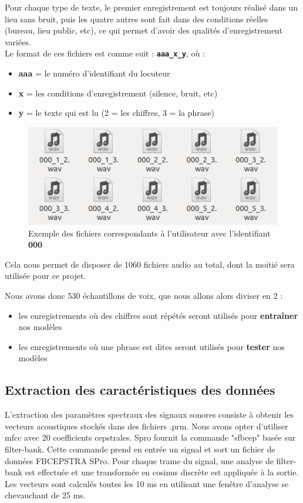 \documentclass[a4paper, 12pt]{book}
\begin{document}
Pour chaque type de texte, le premier enregistrement est toujours réalisé dans un lieu sans bruit, puis les quatre autres sont fait dans des conditions réelles (bureau, lieu public, etc), ce qui permet d'avoir des qualités d'enregistrement variées.\\

Le format de ces fichiers est comme suit : \textbf{\texttt{aaa\_x\_y}}, où :
\begin{itemize}
  \item \textbf{aaa} = le numéro d'identifiant du locuteur
  \item \textbf{x} = les conditions d'enregistrement (silence, bruit, etc)
  \item \textbf{y} = le texte qui est lu (2 = les chiffres, 3 = la phrase)
\end{itemize}

\begin{figure}[htbp]
  \centering
  \includegraphics[width=0.7\linewidth]{images/voiceSamples.png}
  \caption{Exemple des fichiers correspondants à l'utilisateur avec l'identifiant \textbf{000}}
\end{figure}

Cela nous permet de disposer de 1060 fichiers audio au total, dont la moitié sera utilisée pour ce projet.

Nous avons donc 530 échantillons de voix, que nous allons alors diviser en 2 :
\begin{itemize}
  \item les enregistrements où des chiffres sont répétés seront utilisés pour \textbf{entraîner} nos modèles
  \item les enregistrements où une phrase est dites seront utilisés pour \textbf{tester} nos modèles
\end{itemize}

\subsection{Extraction des caractéristiques des données}
L'extraction des paramètres spectraux des signaux sonores consiste à obtenir les vecteurs acoustiques stockés dans des fichiers .prm. Nous avons opter d'utiliser mfcc avec 20 coefficients cepstrales. Spro fournit la commande "sfbcep" basée sur filter-bank. Cette commande prend en entrée un signal et sort un fichier de données FBCEPSTRA SPro. Pour chaque trame du signal, une analyse de filter-bank est effectuée et une transformée en cosinus discrète est appliquée à la sortie. Les vecteurs  sont calculés toutes les 10 ms en utilisant une fenêtre d'analyse se chevauchant de 25 ms.
\end{document}
